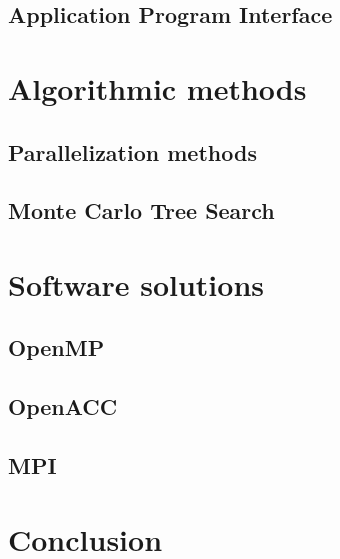 \documentclass[12pt]{article}
\begin{document}
	\subsection{Application Program Interface}		\label{sec:api}	

\newpage

\section{Algorithmic methods}					\label{sec:algorithmicMethods}
	\subsection{Parallelization methods}			\label{sec:parallelization}			
	\subsection{Monte Carlo Tree Search}			\label{sec:mcts}				
\newpage

\section{Software solutions}					\label{sec:softwareSolutions}
	\subsection{OpenMP}					\label{sec:openmp}				
	\subsection{OpenACC}					\label{sec:openacc}			
	\subsection{MPI}						\label{sec:mpi}						
\newpage

\section{Conclusion}						\label{sec:conclusion}			
\newpage

%
%
\end{document}
